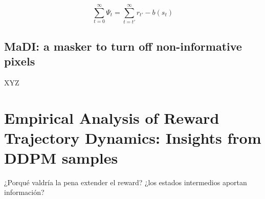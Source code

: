 \begin{equation}\label{eqn:psi-reward-following-action-baseline}
  \sum_{t=0}^{\infty}\Psi_{t} = \sum_{t=t'}^{\infty} r_{t'} - b(s_{t})
\end{equation}


\subsection{MaDI: a masker to turn off non-informative pixels}

XYZ

\section{Empirical Analysis of Reward Trajectory Dynamics: Insights from DDPM samples}

¿Porqué valdría la pena extender el reward? ¿los estados intermedios 
aportan información?


